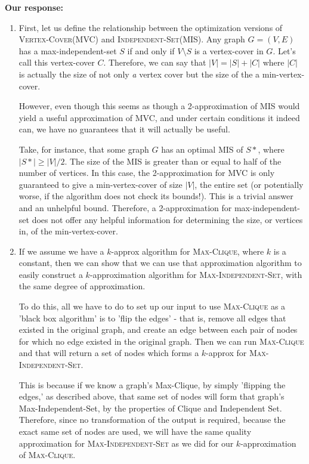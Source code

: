 \documentclass[11pt]{article}
\newcommand{\prob}[1]{\textsc{#1}\xspace}
\newcommand{\vc}{\prob{Vertex-Cover}}
\newcommand{\is}{\prob{Independent-Set}}
\newcommand{\isopt}{\prob{Max-Independent-Set}}
\newcommand{\cliqueopt}{\prob{Max-Clique}}
\begin{document}
\begin{enumerate}
  \textbf{Our response:} 
  
  \begin{enumerate}
      \item First, let us define the relationship between the optimization versions of \vc (MVC) and \is (MIS). 
      Any graph $G = (V,E)$ has a max-independent-set $S$ if and only if $V \setminus S$ is a vertex-cover in $G$.  Let's call this vertex-cover $C$. Therefore, we can say that $|V| = |S| + |C|$ where $|C|$ is actually the size of not only \textit{a} vertex cover but the size of the a min-vertex-cover. 
      
      However, even though this seems as though a 2-approximation of MIS would yield a useful approximation of MVC, and under certain conditions it indeed can, we have no guarantees that it will actually be useful.  
      
      Take, for instance, that some graph $G$ has an optimal MIS of $S*$, where $|S*| \geq |V|/2$.  The size of the MIS is greater than or equal to half of the number of vertices.  In this case, the 2-approximation for MVC is only guaranteed to give a min-vertex-cover of size $|V|$, the entire set (or potentially worse, if the algorithm does not check its bounds!). This is a trivial answer and an unhelpful bound.  Therefore, a 2-approximation for max-independent-set does not offer any helpful information for determining the size, or vertices in, of the min-vertex-cover. 
      
      \item  If we assume we have a $k$-approx algorithm for \cliqueopt, where $k$ is a constant, then we can show that we can use that approximation algorithm to easily construct a  $k$-approximation algorithm for \isopt, with the same degree of approximation.
      
      To do this, all we have to do to set up our input to use \cliqueopt as a 'black box algorithm' is to 'flip the edges' - that is, remove all edges that existed in the original graph, and create an edge between each pair of nodes for which no edge existed in the original graph.  Then we can run \cliqueopt and that will return a set of nodes which forms a $k$-approx for \isopt.  
      
      This is because if we know a graph's Max-Clique, by simply 'flipping the edges,' as described above, that same set of nodes will form that graph's Max-Independent-Set, by the properties of Clique and Independent Set.  Therefore, since no transformation of the output is required, because the exact same set of nodes are used, we will have the same quality approximation for \isopt as we did for our $k$-approximation of \cliqueopt.
      

\end{enumerate}
\end{enumerate}
\end{document}
